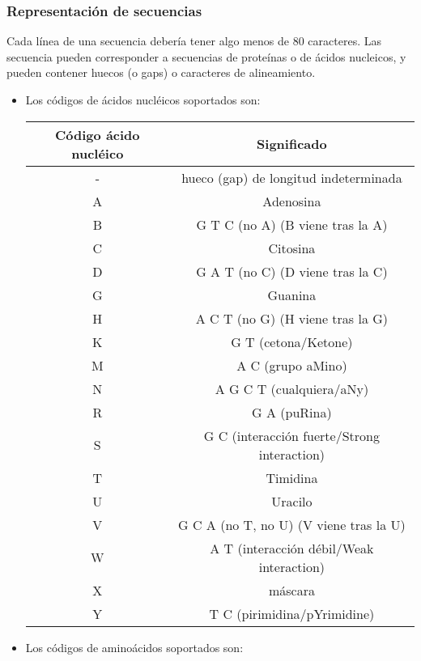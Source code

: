 \documentclass[12pt,a4paper,spanish]{article}
\begin{document}
		\subsubsection{Representación de secuencias}	
			\par Cada línea de una secuencia debería tener algo menos de 80 caracteres. Las secuencia pueden corresponder a secuencias de proteínas 			 o de ácidos nucleicos, y pueden contener huecos (o gaps) o caracteres de alineamiento.
			 \begin{itemize}
				\item Los códigos de ácidos nucléicos soportados son:
					\begin{center}
						\begin{tabular}{| c | c |}
							\hline
							{\bf Código ácido nucléico} & {\bf Significado} \\
							\hline
							\hline		
							- &	hueco (gap) de longitud indeterminada \\\hline
							A & Adenosina \\\hline
							B &	G T C (no A) (B viene tras la A)	\\\hline 
							C &	Citosina \\\hline
							D &	G A T (no C) (D viene tras la C) \\\hline
							G &	Guanina \\\hline
							H &	A C T (no G) (H viene tras la G) \\\hline
							K &	G T (cetona/Ketone) \\\hline
							M &	A C (grupo aMino) \\\hline
							N &	A G C T (cualquiera/aNy) \\\hline
							R &	G A (puRina) \\\hline
							S &	G C (interacción fuerte/Strong interaction) \\\hline
							T &	Timidina \\\hline
							U &	Uracilo \\\hline
							V &	G C A (no T, no U) (V viene tras la U) \\\hline
							W &	A T (interacción débil/Weak interaction) \\\hline
							X &	máscara \\\hline
							Y &	T C (pirimidina/pYrimidine) \\\hline
						\end{tabular}
					\end{center}	
				\item Los códigos de aminoácidos soportados son:

\end{itemize}
\end{document}
